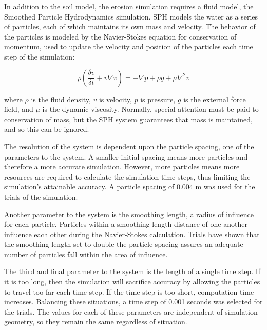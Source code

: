 
In addition to the soil model, the erosion simulation requires a fluid model, the Smoothed Particle Hydrodynamics simulation. SPH models the water as a series of particles, each of which maintains its own mass and velocity. The behavior of the particles is modeled by the Navier-Stokes equation for conservation of momentum, used to update the velocity and position of the particles each time step of the simulation:

\begin{equation}
  \rho\left(\dfrac{\delta v}{\delta t} + v \nabla v \right) = - \nabla p + \rho g + \mu \nabla^{2} v
\end{equation}

\noindent where $\rho$ is the fluid density, $v$ is velocity, $p$ is pressure, $g$ is the external force field, and $\mu$ is the dynamic viscosity. Normally, special attention must be paid to conservation of mass, but the SPH system guarantees that mass is maintained, and so this can be ignored.

The resolution of the system is dependent upon the particle spacing, one of the parameters to the system. A smaller initial spacing means more particles and therefore a more accurate simulation. However, more particles means more resources are required to calculate the simulation time steps, thus limiting the simulation's attainable accuracy. A particle spacing of 0.004 m was used for the trials of the simulation.

Another parameter to the system is the smoothing length, a radius of influence for each particle. Particles within a smoothing length distance of one another influence each other during the Navier-Stokes calculation. Trials have shown that the smoothing length set to double the particle spacing assures an adequate number of particles fall within the area of influence.

The third and final parameter to the system is the length of a single time step. If it is too long, then the simulation will sacrifice accuracy by allowing the particles to travel too far each time step. If the time step is too short, computation time increases. Balancing these situations, a time step of 0.001 seconds was selected for the trials. 
The values for each of these parameters are independent of simulation geometry, so they remain the same regardless of situation.

